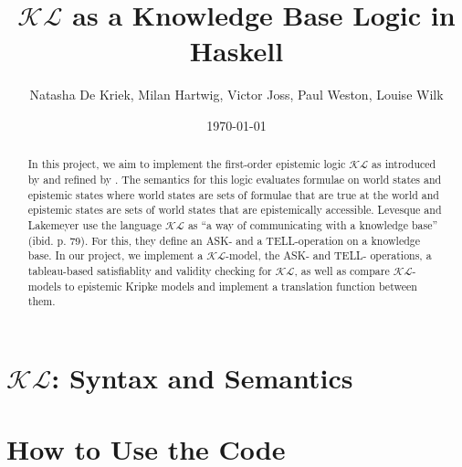 \documentclass[12pt,a4paper]{article}
\title{$\mathcal{KL}$ as a Knowledge Base Logic in Haskell}
\author{Natasha De Kriek, Milan Hartwig, Victor Joss, Paul Weston, Louise Wilk}
\date{\today}
\begin{document}
\maketitle

\begin{abstract}
In this project, we aim to implement the first-order epistemic logic $\mathcal{KL}$ as introduced by \textcite{levesque1981} and refined by \textcite{Lokb}. 
The semantics for this logic evaluates formulae on world states and epistemic states where world states are sets of formulae that are true at the world and epistemic states are sets of world states that are epistemically accessible. Levesque and Lakemeyer use the language $\mathcal{KL}$ as “a way of communicating with a knowledge base” (ibid. p. 79). For this, they define an ASK- and a TELL-operation on a knowledge base. In our project, we implement a  $\mathcal{KL}$-model, the ASK- and TELL- operations, a tableau-based satisfiablity and validity checking for  $\mathcal{KL}$, as well as compare  $\mathcal{KL}$-models to epistemic Kripke models and implement a translation function between them.
\end{abstract}


\tableofcontents

\clearpage


%


\section{\texorpdfstring{$\mathcal{KL}$}{KL}: Syntax and Semantics}\label{sec:KLmodel}














% 

\section{How to Use the Code}
\end{document}
